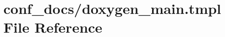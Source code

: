\hypertarget{doxygen__main_8tmpl}{
\section{conf\_\-docs/doxygen\_\-main.tmpl File Reference}
\label{doxygen__main_8tmpl}
}
